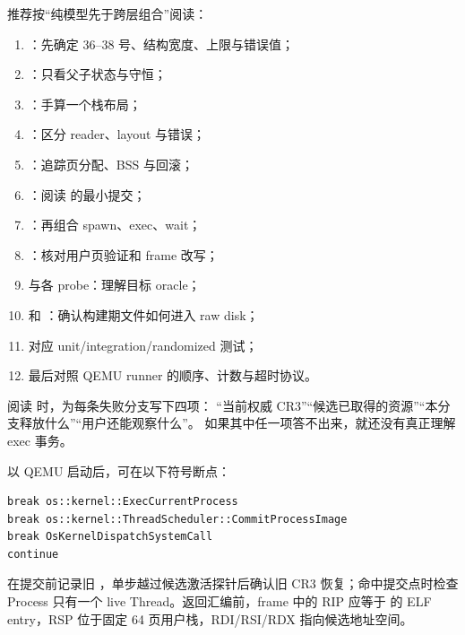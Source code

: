 推荐按“纯模型先于跨层组合”阅读：

\begin{enumerate}
  \item {}：先确定 36--38
        号、结构宽度、上限与错误值；
  \item {}：只看父子状态与守恒；
  \item {}：手算一个栈布局；
  \item {}：区分 reader、layout 与错误；
  \item {}：追踪页分配、BSS 与回滚；
  \item {}：阅读
         的最小提交；
  \item {}：再组合 spawn、exec、wait；
  \item {}：核对用户页验证和 frame 改写；
  \item {} 与各 probe：理解目标 oracle；
  \item {} 和
        ：确认构建期文件如何进入 raw disk；
  \item 对应 unit/integration/randomized 测试；
  \item 最后对照 QEMU runner 的顺序、计数与超时协议。
\end{enumerate}

阅读  时，为每条失败分支写下四项：
“当前权威 CR3”“候选已取得的资源”“本分支释放什么”“用户还能观察什么”。
如果其中任一项答不出来，就还没有真正理解 exec 事务。

以 QEMU  启动后，可在以下符号断点：

\begin{lstlisting}[caption={exec 的硬件状态观察点}]
break os::kernel::ExecCurrentProcess
break os::kernel::ThreadScheduler::CommitProcessImage
break OsKernelDispatchSystemCall
continue
\end{lstlisting}

在提交前记录旧 ，单步越过候选激活探针后确认旧 CR3
恢复；命中提交点时检查 Process 只有一个 live Thread。返回汇编前，frame
中的 RIP 应等于  的 ELF entry，RSP 位于固定
64 页用户栈，RDI/RSI/RDX 指向候选地址空间。

